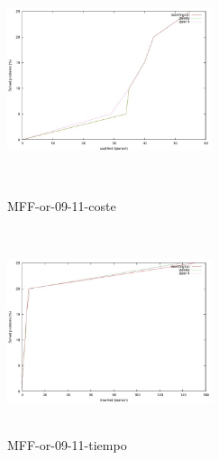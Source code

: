 \documentclass{article}
\begin{document}
\begin{figure}[!htb]
   \begin{minipage}{0.48\textwidth}
     \centering
     \includegraphics[width=6cm, height=6cm]{mff-or-09-11-cost}
    \caption{MFF-or-09-11-coste}
   \end{minipage}\hfill
   \begin {minipage}{0.48\textwidth}
     \centering
     \includegraphics[width=6cm, height=6cm]{mff-or-09-11-time}
    \caption{MFF-or-09-11-tiempo}
   \end{minipage}
\end{figure}
\end{document}
